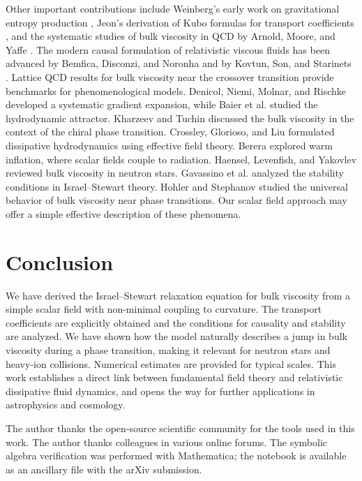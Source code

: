 \documentclass[aps,prd,reprint,superscriptaddress,floatfix]{revtex4-2}
\begin{document}
Other important contributions include Weinberg's early work on gravitational entropy production \cite{Weinberg1971}, Jeon's derivation of Kubo formulas for transport coefficients \cite{Jeon1995}, and the systematic studies of bulk viscosity in QCD by Arnold, Moore, and Yaffe \cite{ArnoldMooreYaffe}. The modern causal formulation of relativistic viscous fluids has been advanced by Bemfica, Disconzi, and Noronha \cite{Bemfica2022} and by Kovtun, Son, and Starinets \cite{Kovtun2005}. Lattice QCD results for bulk viscosity near the crossover transition \cite{Meyer2008, Borsanyi2012} provide benchmarks for phenomenological models. Denicol, Niemi, Molnar, and Rischke \cite{Denicol2012} developed a systematic gradient expansion, while Baier et al. \cite{Baier2008} studied the hydrodynamic attractor. Kharzeev and Tuchin \cite{Kharzeev2008} discussed the bulk viscosity in the context of the chiral phase transition. Crossley, Glorioso, and Liu \cite{Crossley2017} formulated dissipative hydrodynamics using effective field theory. Berera \cite{Berera2000} explored warm inflation, where scalar fields couple to radiation. Haensel, Levenfish, and Yakovlev \cite{Haensel2002} reviewed bulk viscosity in neutron stars. Gavassino et al. \cite{Gavassino2021} analyzed the stability conditions in Israel--Stewart theory. Hohler and Stephanov \cite{Hohler2009} studied the universal behavior of bulk viscosity near phase transitions. Our scalar field approach may offer a simple effective description of these phenomena.

\section{Conclusion}
\label{sec:conclusion}

We have derived the Israel--Stewart relaxation equation for bulk viscosity from a simple scalar field with non-minimal coupling to curvature. The transport coefficients are explicitly obtained and the conditions for causality and stability are analyzed. We have shown how the model naturally describes a jump in bulk viscosity during a phase transition, making it relevant for neutron stars and heavy-ion collisions. Numerical estimates are provided for typical scales. This work establishes a direct link between fundamental field theory and relativistic dissipative fluid dynamics, and opens the way for further applications in astrophysics and cosmology.

\begin{acknowledgments}
The author thanks the open‑source scientific community for the tools used in this work. The author thanks colleagues in various online forums. The symbolic algebra verification was performed with Mathematica; the notebook is available as an ancillary file with the arXiv submission.
\end{acknowledgments}
\end{document}
